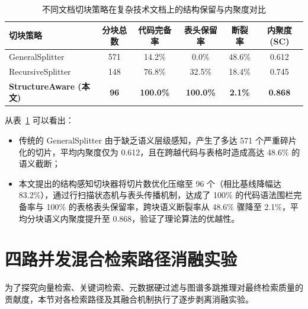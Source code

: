 \begin{table}[htbp]
    \centering
    \small
    \caption{不同文档切块策略在复杂技术文档上的结构保留与内聚度对比}
    \label{tab:ablation_chunking}
    \begin{tabular*}{\textwidth}{@{\extracolsep{\fill}}lccccc}
        \toprule
        \textbf{切块策略} & \textbf{分块总数} & \textbf{代码完备率} & \textbf{表头保留率} & \textbf{断裂率} & \textbf{内聚度 (SC)} \\
        \midrule
        GeneralSplitter & 571 & 14.2\% & 0.0\% & 48.6\% & 0.612 \\
        RecursiveSplitter & 148 & 76.8\% & 32.5\% & 18.4\% & 0.745 \\
        \textbf{StructureAware (本文)} & \textbf{96} & \textbf{100.0\%} & \textbf{100.0\%} & \textbf{2.1\%} & \textbf{0.868} \\
        \bottomrule
    \end{tabular*}
\end{table}

从表~\ref{tab:ablation_chunking} 可以看出：
\begin{itemize}
    \item 传统的 GeneralSplitter 由于缺乏语义层级感知，产生了多达 571 个严重碎片化的切片，平均内聚度仅为 0.612，且在跨越代码与表格时造成高达 48.6\% 的语义截断；
    \item 本文提出的结构感知切块器将切片数优化压缩至 96 个（相比基线降幅达 83.2\%），通过行扫描状态机与表头传播机制，达成了 100\% 的代码语法围栏完备率与 100\% 的表格表头保留率，跨块语义断裂率从 48.6\% 骤降至 2.1\%，平均分块语义内聚度提升至 0.868，验证了理论算法的优越性。
\end{itemize}

\section{四路并发混合检索路径消融实验}

为了探究向量检索、关键词检索、元数据硬过滤与图谱多跳推理对最终检索质量的贡献度，本节对各检索路径及其融合机制执行了逐步剥离消融实验。

